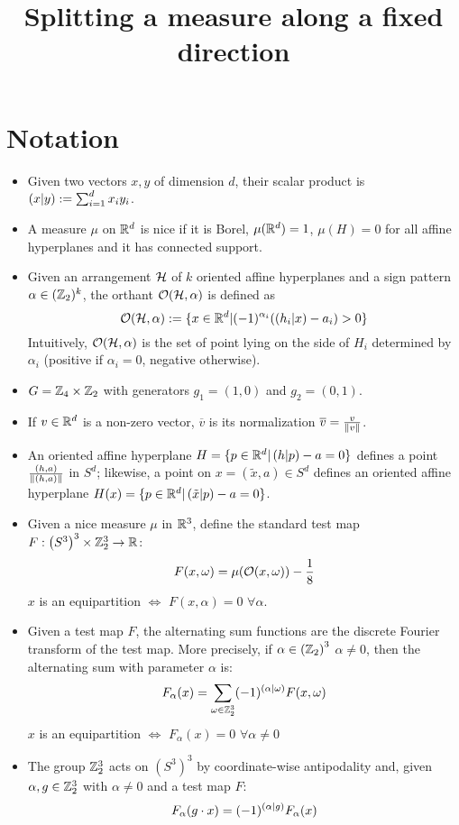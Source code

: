 \documentclass[10pt]{article}
\title{Splitting a measure along a fixed direction}
\author{}
\begin{document}
\maketitle
\section*{Notation}
\begin{itemize}
 \item Given two vectors $x, y$ of dimension $d$,  their scalar product is $\left( x \vert y\right):=\sum_{i=1}^d x_iy_i$.
\item A measure $\mu$ on $\mathbb{R}^d$ is nice if it is Borel, $\mu(\mathbb{R}^d)=1$, $\mu(H) = 0$ for all affine hyperplanes and it has connected support.
\item Given an arrangement $\mathcal{H}$ of $k$ oriented affine hyperplanes and a sign pattern $\alpha\in (\mathbb{Z}_2)^k$, the orthant $\mathcal{O}(\mathcal{H}, \alpha)$ is defined as
  \[
    \mathcal{O}(\mathcal{H}, \alpha) := \{x\in \mathbb{R}^d \vert (-1)^{\alpha_i}(\left( h_i \vert x\right) - a_i) > 0 \}
  \]
  Intuitively, $\mathcal{O}(\mathcal{H}, \alpha)$ is the set of point lying on the side of $H_i$ determined by $\alpha_i$ (positive if $\alpha_i=0$, negative otherwise).
\item $G= \mathbb{Z}_4\times \mathbb{Z}_2$ with generators $g_1 = (1,0)$ and $g_2=(0, 1)$.
\item If $v\in \mathbb{R}^d$ is a non-zero vector, $\overline{v}$ is its normalization $\overline{v}=\frac{v}{\lVert v \rVert}$.
\item An oriented affine hyperplane $H = \{p\in \mathbb{R}^d \vert \left( h \vert p\right) - a =0 \}$ defines a point $\frac{(h, a)}{\lVert (h,a) \rVert}$ in $S^d$; likewise, a point on $x = (\tilde x, a)\in S^d$ defines an oriented affine hyperplane $H(x) = \{p\in \mathbb{R}^d \vert \left( \tilde x \vert p\right) -a = 0 \}$.
\item Given a nice measure $\mu$ in $\mathbb{R}^3$, define the standard test map $F:\left(S^3 \right)^3 \times \mathbb{Z}_2^3  \rightarrow \mathbb{R}$:
  \[
    F(x, \omega) = \mu(\mathcal{O}(x, \omega))  - \frac{1}{8}
  \]
  $x$ is an equipartition $\iff$ $F(x, \alpha) = 0$ $\forall \alpha$.
\item Given a test map $F$, the alternating sum functions are the discrete Fourier transform of the test map. More precisely, if $\alpha \in \left( \mathbb{Z}_2\right)^3$
  $\alpha \neq 0$, then the alternating sum with parameter $\alpha$ is:
  \[
    F_\alpha(x) = \sum_{\omega\in \mathbb{Z}_2^3} (-1)^{\left( \alpha \vert \omega\right)} F(x, \omega)
  \]
  $x$ is an equipartition $\iff$ $F_\alpha(x) = 0$ $\forall \alpha \neq 0$
\item The group $\mathbb{Z}_2^3$ acts on $\left(S^3 \right)^3$ by coordinate-wise antipodality and, given $\alpha, g \in \mathbb{Z}_2^3$ with $\alpha\neq 0$ and a test map $F$:
  \[
    F_\alpha(g\cdot x) = (-1)^{\left( \alpha \vert g\right)}F_\alpha(x)
  \]
\end{itemize}
\end{document}
